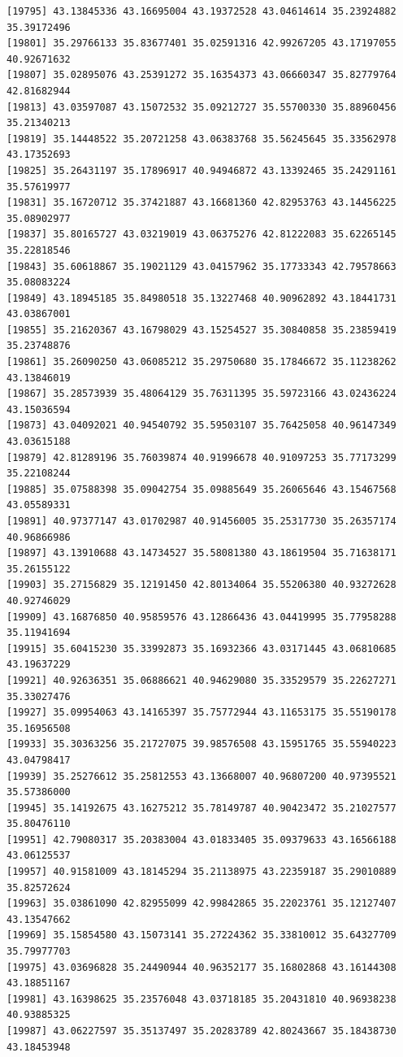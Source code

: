 \documentclass[
  letterpaper,
  DIV=11,
  numbers=noendperiod]{scrartcl}
\begin{document}
\begin{verbatim}
[19795] 43.13845336 43.16695004 43.19372528 43.04614614 35.23924882 35.39172496
[19801] 35.29766133 35.83677401 35.02591316 42.99267205 43.17197055 40.92671632
[19807] 35.02895076 43.25391272 35.16354373 43.06660347 35.82779764 42.81682944
[19813] 43.03597087 43.15072532 35.09212727 35.55700330 35.88960456 35.21340213
[19819] 35.14448522 35.20721258 43.06383768 35.56245645 35.33562978 43.17352693
[19825] 35.26431197 35.17896917 40.94946872 43.13392465 35.24291161 35.57619977
[19831] 35.16720712 35.37421887 43.16681360 42.82953763 43.14456225 35.08902977
[19837] 35.80165727 43.03219019 43.06375276 42.81222083 35.62265145 35.22818546
[19843] 35.60618867 35.19021129 43.04157962 35.17733343 42.79578663 35.08083224
[19849] 43.18945185 35.84980518 35.13227468 40.90962892 43.18441731 43.03867001
[19855] 35.21620367 43.16798029 43.15254527 35.30840858 35.23859419 35.23748876
[19861] 35.26090250 43.06085212 35.29750680 35.17846672 35.11238262 43.13846019
[19867] 35.28573939 35.48064129 35.76311395 35.59723166 43.02436224 43.15036594
[19873] 43.04092021 40.94540792 35.59503107 35.76425058 40.96147349 43.03615188
[19879] 42.81289196 35.76039874 40.91996678 40.91097253 35.77173299 35.22108244
[19885] 35.07588398 35.09042754 35.09885649 35.26065646 43.15467568 43.05589331
[19891] 40.97377147 43.01702987 40.91456005 35.25317730 35.26357174 40.96866986
[19897] 43.13910688 43.14734527 35.58081380 43.18619504 35.71638171 35.26155122
[19903] 35.27156829 35.12191450 42.80134064 35.55206380 40.93272628 40.92746029
[19909] 43.16876850 40.95859576 43.12866436 43.04419995 35.77958288 35.11941694
[19915] 35.60415230 35.33992873 35.16932366 43.03171445 43.06810685 43.19637229
[19921] 40.92636351 35.06886621 40.94629080 35.33529579 35.22627271 35.33027476
[19927] 35.09954063 43.14165397 35.75772944 43.11653175 35.55190178 35.16956508
[19933] 35.30363256 35.21727075 39.98576508 43.15951765 35.55940223 43.04798417
[19939] 35.25276612 35.25812553 43.13668007 40.96807200 40.97395521 35.57386000
[19945] 35.14192675 43.16275212 35.78149787 40.90423472 35.21027577 35.80476110
[19951] 42.79080317 35.20383004 43.01833405 35.09379633 43.16566188 43.06125537
[19957] 40.91581009 43.18145294 35.21138975 43.22359187 35.29010889 35.82572624
[19963] 35.03861090 42.82955099 42.99842865 35.22023761 35.12127407 43.13547662
[19969] 35.15854580 43.15073141 35.27224362 35.33810012 35.64327709 35.79977703
[19975] 43.03696828 35.24490944 40.96352177 35.16802868 43.16144308 43.18851167
[19981] 43.16398625 35.23576048 43.03718185 35.20431810 40.96938238 40.93885325
[19987] 43.06227597 35.35137497 35.20283789 42.80243667 35.18438730 43.18453948

\end{verbatim}
\end{document}
